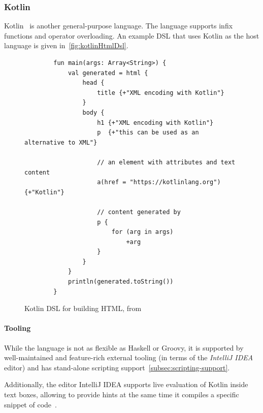 \subsubsection{Kotlin}\label{subsubsec:kotlinLang}

Kotlin~\cite{kotlinLang} is another general-purpose language.
The language supports infix functions and operator overloading.
An example DSL that uses Kotlin as the host language is given in~\autoref{fig:kotlinHtmlDsl}.

\begin{figure}[h]
    \centering
    \begin{minipage}{0.9\textwidth}
        \begin{verbatim}
        fun main(args: Array<String>) {
            val generated = html {
                head {
                    title {+"XML encoding with Kotlin"}
                }
                body {
                    h1 {+"XML encoding with Kotlin"}
                    p  {+"this can be used as an alternative to XML"}

                    // an element with attributes and text content
                    a(href = "https://kotlinlang.org") {+"Kotlin"}

                    // content generated by
                    p {
                        for (arg in args)
                            +arg
                    }
                }
            }
            println(generated.toString())
        }
        \end{verbatim}
    \end{minipage}
    \caption{Kotlin DSL for building HTML, from~\cite{kotlinTypeSafeHTL}}
    \label{fig:kotlinHtmlDsl}
\end{figure}

\paragraph{Tooling} While the language is not as flexible as Haskell or Groovy, it is supported by well-maintained and feature-rich external tooling (in terms of the \textit{IntelliJ IDEA} editor) and has stand-alone scripting support~\autoref{subsec:scripting-support}.

Additionally, the editor IntelliJ IDEA supports live evaluation of Kotlin inside text boxes, allowing to provide hints at the same time it compiles a specific snippet of code~\cite{intelliJRepo}.

